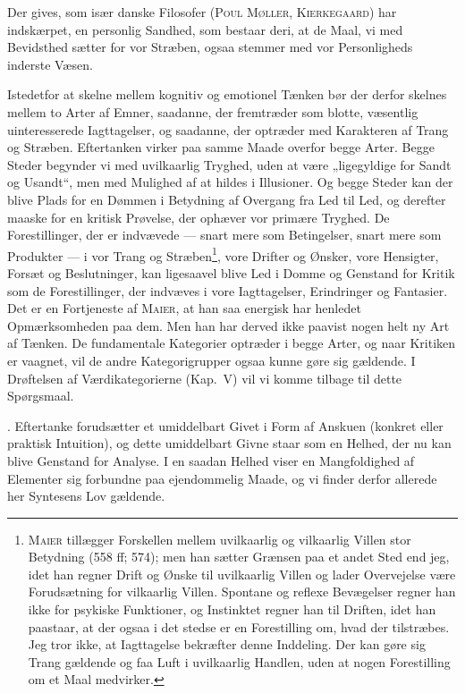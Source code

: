 \documentclass[12pt]{article}
\newcommand{\opage}[1]{\marginnote{\footnotesize\textit{[#1]}}}
\begin{document}
Der gives, som især danske Filosofer (\textsc{Poul Møller}, \textsc{Kierkegaard}) har
indskærpet, en personlig Sandhed, som bestaar deri, at de Maal, vi med Bevidsthed
sætter for vor Stræben, ogsaa stemmer med vor Personligheds inderste Væsen.

Istedetfor at skelne mellem kognitiv og emotionel Tænken bør der derfor
skelnes mellem to Arter af Emner, saadanne, der fremtræder som blotte, væsentlig
uinteresserede Iagttagelser, og saadanne, der optræder med Karakteren af Trang
og Stræben. Eftertanken virker paa samme Maade overfor begge Arter. Begge
Steder begynder vi med uvilkaarlig Tryghed, uden at være „ligegyldige for Sandt
og Usandt“, men med Mulighed af at hildes i Illusioner. Og begge Steder kan
der blive Plads for en Dømmen i Betydning af Overgang fra Led til Led, og derefter
maaske for en kritisk Prøvelse, der ophæver vor primære Tryghed. De
Forestillinger, der er indvævede --- snart mere som Betingelser, snart mere som
Produkter --- i vor Trang og Stræben\footnote{\textsc{Maier} tillægger Forskellen
mellem uvilkaarlig og vilkaarlig Villen stor Betydning (558 ff; 574); men han
sætter Grænsen paa et
andet Sted end jeg, idet han regner Drift og Ønske til
uvilkaarlig Villen og lader Overvejelse være Forudsætning for vilkaarlig Villen.
Spontane og reflexe Bevægelser
regner han ikke for psykiske Funktioner, og Instinktet regner han til Driften,
idet han paastaar, at der ogsaa i det stedse er en Forestilling om, hvad der
tilstræbes. Jeg tror ikke, at Iagttagelse bekræfter denne Inddeling. Der kan
gøre sig Trang gældende og faa Luft i uvilkaarlig Handlen, uden at nogen
Forestilling om et Maal medvirker.}, vore Drifter og Ønsker, vore Hensigter, Forsæt
\setcounter{footnote}{0}%
\opage{28}og Beslutninger, kan ligesaavel blive Led i Domme og Genstand for Kritik som
de Forestillinger, der indvæves i vore Iagttagelser, Erindringer og Fantasier. Det
er en Fortjeneste af \textsc{Maier}, at han saa energisk har henledet Opmærksomheden
paa dem. Men han har derved ikke paavist nogen helt ny Art af Tænken. De
fundamentale Kategorier optræder i begge Arter, og naar Kritiken er vaagnet, vil
de andre Kategorigrupper ogsaa kunne gøre sig gældende. I Drøftelsen af
Værdikategorierne (Kap.~V) vil vi komme tilbage til dette Spørgsmaal.

. Eftertanke forudsætter et umiddelbart Givet i Form af Anskuen (konkret
eller praktisk Intuition), og dette umiddelbart Givne staar som en Helhed, der nu
kan blive Genstand for Analyse. I en saadan Helhed viser en Mangfoldighed af
Elementer sig forbundne paa ejendommelig Maade, og vi finder derfor allerede
her Syntesens Lov gældende.
\end{document}
